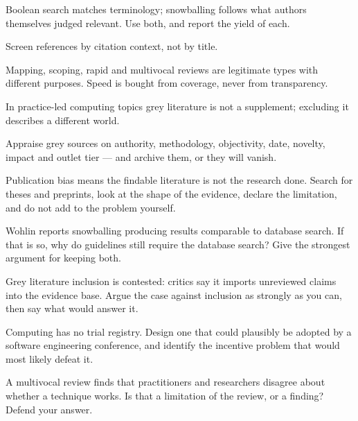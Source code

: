\begin{chaptersummary}
\begin{tight}
  \item Boolean search matches terminology; snowballing follows what authors
    themselves judged relevant. Use both, and report the yield of each.
  \item Screen references by citation context, not by title.
  \item Mapping, scoping, rapid and multivocal reviews are legitimate types
    with different purposes. Speed is bought from coverage, never from
    transparency.
  \item In practice-led computing topics grey literature is not a supplement;
    excluding it describes a different world.
  \item Appraise grey sources on authority, methodology, objectivity, date,
    novelty, impact and outlet tier --- and archive them, or they will vanish.
  \item Publication bias means the findable literature is not the research
    done. Search for theses and preprints, look at the shape of the evidence,
    declare the limitation, and do not add to the problem yourself.
\end{tight}
\end{chaptersummary}

\begin{reviewq}
  \item Wohlin reports snowballing producing results comparable to database
    search. If that is so, why do guidelines still require the database search?
    Give the strongest argument for keeping both.
  \item Grey literature inclusion is contested: critics say it imports
    unreviewed claims into the evidence base. Argue the case against inclusion
    as strongly as you can, then say what would answer it.
  \item Computing has no trial registry. Design one that could plausibly be
    adopted by a software engineering conference, and identify the incentive
    problem that would most likely defeat it.
  \item A multivocal review finds that practitioners and researchers disagree
    about whether a technique works. Is that a limitation of the review, or a
    finding? Defend your answer.
\end{reviewq}
